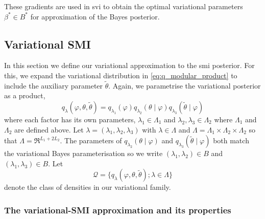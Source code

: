 These gradients are used in \acrlong*{svi} \citep{Hoffman2013svi} to obtain the optimal variational parameters $\beta^*\in B^*$ for approximation of the Bayes posterior.

\subsection{Variational SMI}\label{subsec:vsmi}

In this section we define our variational approximation to the \acrshort*{smi} posterior.
For this, we expand the variational distribution in \cref{eq:q_modular_product} to include the auxiliary parameter $\tilde\theta$.
Again, we parametrise the variational posterior as a product,
\begin{equation}\label{eq:q_modular_smi_product}
  q_{\lambda}(\varphi,\theta, \tilde\theta) = q_{\lambda_1}(\varphi) q_{\lambda_2}(\theta \mid \varphi) q_{\lambda_3}(\tilde\theta \mid \varphi)
\end{equation}
where each factor has its own parameters, $\lambda_1\in \Lambda_1$ and $\lambda_2,\lambda_3\in \Lambda_2$ where $\Lambda_1$ and $\Lambda_2$ are defined above. Let $\lambda=(\lambda_1,\lambda_2,\lambda_3)$ with $\lambda\in \Lambda$ and $\Lambda=\Lambda_1\times \Lambda_2\times \Lambda_2$ so that $\Lambda=\Re^{L_1+2L_2}$. The parameters of $q_{\lambda_2}(\theta \mid \varphi)$ and $q_{\lambda_3}(\tilde\theta \mid \varphi)$ both match the variational Bayes parameterisation so we write $(\lambda_1,\lambda_2)\in B$ and $(\lambda_1,\lambda_3)\in B$.
Let
\[
  \mathcal{Q}=\{q_\lambda(\varphi,\theta,\tilde\theta); \lambda\in \Lambda\}
\]
denote the class of densities in our variational family.

\subsubsection{The variational-SMI approximation and its properties}

